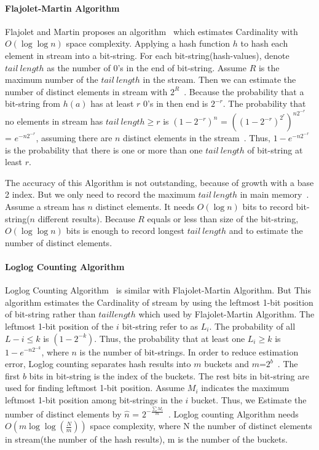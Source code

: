 \paragraph{Flajolet-Martin Algorithm}

Flajolet and Martin proposes an algorithm~\cite{flajolet1985probabilistic} which
estimates Cardinality with $O(\log\log n)$ space complexity. Applying a hash
function $h$ to hash each element in stream into a bit-string. For each
bit-string(hash-values), denote $tail\ length$ as the number of 0's in the end
of bit-string. Assume $R$ is the maximum number of the $tail\ length$ in the
stream. Then we can estimate the number of distinct elements in stream with
$2^R$~\cite{flajolet1985probabilistic}. Because the probability that a
bit-string from $h(a)$ has at least $r$ 0's in then end is $2^{-r}$. The
probability that no elements in stream has $tail\ length \geqslant r$ is
$(1-2^{-r})^n$ = $((1-2^{-r})^{2^r})^{n2^{-r}}$ = $e^{-n2^{-r}}$, assuming there
are $n$ distinct elements in the stream~\cite{leskovec2014mining}. Thus,
$1-e^{-n2^{-r}}$ is the probability that there is one or more than one $tail\
length$ of bit-string at least $r$.

The accuracy of this Algorithm is not outstanding, because of growth with a base
2 index. But we only need to record the maximum $tail\ length$ in main
memory~\cite{leskovec2014mining}. Assume a stream has $n$ distinct elements. It
needs $O(\log n)$ bits to record bit-string($n$ different results). Because $R$
equals or less than size of the bit-string, $O(\log\log n)$ bits is enough to
record longest $tail\ length$ and to estimate the number of distinct elements. 
\paragraph{Loglog Counting Algorithm}

Loglog Counting Algorithm~\cite{durand2003loglog} is similar with
Flajolet-Martin Algorithm. But This algorithm estimates the Cardinality of
stream by using the leftmost 1-bit position of bit-string rather than $tail
length$ which used by Flajolet-Martin Algorithm. The leftmost 1-bit position of
the $i$ bit-string refer to as $L_i$. The probability of all $L-i \leq k$ is
$(1-2^{-k})$. Thus, the probability that at least one $L_i \geqslant k$ is
$1-e^{-n2^{-k}}$, where $n$ is the number of bit-strings. In order to reduce
estimation error, Loglog counting separates hash results into $m$ buckets and
$m$=$2^b$~\cite{durand2003loglog}. The first $b$ bits in bit-string is the index
of the buckets. The rest bits in bit-string are used for finding leftmost 1-bit
position. Assume $M_i$ indicates the maximum leftmost 1-bit position among
bit-strings in the $i$ bucket. Thus, we Estimate the number of distinct elements
by $\hat{n}$ = $2^{-\frac{\sum M_i}{m}}$~\cite{durand2003loglog}. Loglog
counting Algorithm needs $O(m \log\log(\frac{N}{m}))$ space complexity, where N
the number of distinct elements in stream(the number of the hash results), m is
the number of the buckets. 

